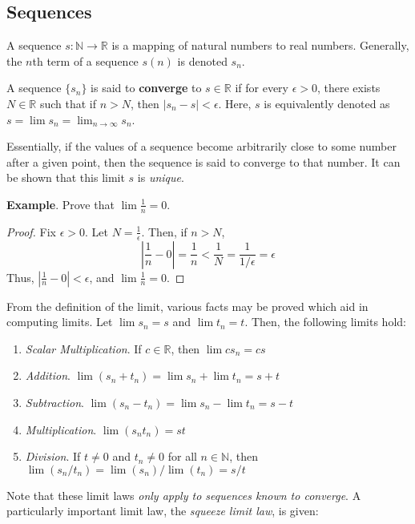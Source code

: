\subsection{Sequences}

A sequence $s:\mathbb{N}\to\mathbb{R}$ is a mapping of natural numbers to real numbers. Generally, the $n$th term of a sequence $s(n)$ is denoted $s_n$.

\begin{defn}
    A sequence $\{s_n\}$ is said to \textbf{converge} to $s\in\mathbb{R}$ if for every $\epsilon>0$, there exists $N\in\mathbb{R}$ such that if $n>N$, then $|s_n - s| < \epsilon$. Here, $s$ is equivalently denoted as $s = \lim s_n = \displaystyle\lim_{n\to\infty} s_n$.
\end{defn}
Essentially, if the values of a sequence become arbitrarily close to some number after a given point, then the sequence is said to converge to that number. It can be shown that this limit $s$ is \textit{unique}.

\textbf{Example}. Prove that $\lim \frac{1}{n} = 0$. \begin{proof}
    Fix $\epsilon > 0$. Let $N = \frac{1}{\epsilon}$. Then, if $n>N$, \[\left|\frac{1}{n} - 0\right| = \frac{1}{n} < \frac{1}{N} = \frac{1}{1/\epsilon} = \epsilon\] Thus, $\left|\frac{1}{n} - 0\right| < \epsilon$, and $\lim \frac{1}{n}=0$.
\end{proof}

\newpage

From the definition of the limit, various facts may be proved which aid in computing limits. Let $\lim s_n = s$ and $\lim t_n = t$. Then, the following limits hold:
\begin{enumerate}
\vspace{-1em}
    \item[] \textit{Scalar Multiplication}. If $c\in \mathbb{R}$, then $\lim cs_n = cs$
    \item[] \textit{Addition}. $\lim (s_n+t_n) = \lim s_n + \lim t_n = s+t$
    \item[] \textit{Subtraction}. $\lim (s_n - t_n) = \lim s_n - \lim t_n = s-t$
    \item[] \textit{Multiplication}. $\lim (s_nt_n) = st$
    \item[] \textit{Division}. If $t\neq 0$ and $t_n\neq 0$ for all $n\in \mathbb{N}$, then $\lim (s_n/t_n) = \lim(s_n)/\lim(t_n) = s/t$
    \vspace{-1em}
\end{enumerate} Note that these limit laws \textit{only apply to sequences known to converge}. A particularly important limit law, the \textit{squeeze limit law}, is given:

